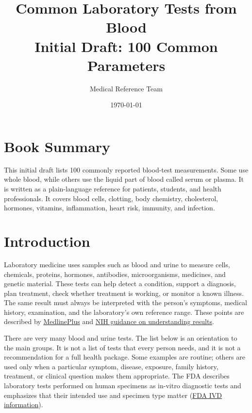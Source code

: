 \documentclass[11pt,openany]{book}
\title{Common Laboratory Tests from Blood\\
\large Initial Draft: 100 Common Parameters}
\author{Medical Reference Team}
\date{\today}
\begin{document}
\sloppy

\maketitle

\tableofcontents

\clearpage

\chapter*{Book Summary}
This initial draft lists 100 commonly reported blood-test measurements. Some
use whole blood, while others use the liquid part of blood called serum or
plasma. It is written as a plain-language reference for patients, students,
and health professionals. It covers blood cells, clotting, body chemistry,
cholesterol, hormones, vitamins, inflammation, heart risk, immunity, and
infection.

\chapter{Introduction}

Laboratory medicine uses samples such as blood and urine to measure cells,
chemicals, proteins, hormones, antibodies, microorganisms, medicines, and
genetic material. These tests can help detect a condition, support a diagnosis,
plan treatment, check whether treatment is working, or monitor a known illness.
The same result must always be interpreted with the person's symptoms, medical
history, examination, and the laboratory's own reference range. These points
are described by \href{https://medlineplus.gov/laboratorytests.html}{MedlinePlus}
and \href{https://medlineplus.gov/lab-tests/how-to-understand-your-lab-results/}{NIH guidance on understanding results}.

There are very many blood and urine tests. The list below is an orientation to
the main groups. It is not a list of tests that every person needs, and it is
not a recommendation for a full health package. Some examples are routine;
others are used only when a particular symptom, disease, exposure, family
history, treatment, or clinical question makes them appropriate. The FDA
describes laboratory tests performed on human specimens as in-vitro diagnostic
tests and emphasizes that their intended use and specimen type matter
(\href{https://www.fda.gov/medical-devices/products-and-medical-procedures/in-vitro-diagnostics}{FDA IVD information}).
\end{document}
